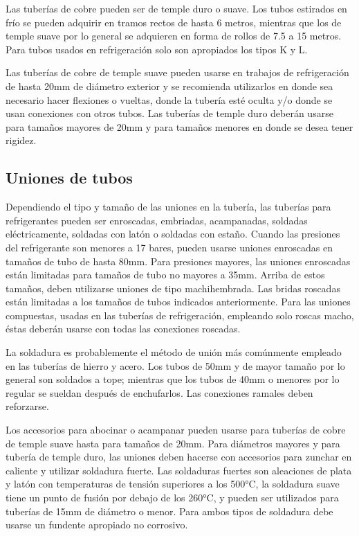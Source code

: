 	Las tuberías de cobre pueden ser de temple duro o suave. Los tubos estirados en frío se pueden adquirir en tramos rectos de hasta 6 metros, mientras que los de temple suave por lo general se adquieren en forma de rollos de 7.5 a 15 metros. Para tubos usados en refrigeración solo son apropiados los tipos K y L. 

	Las tuberías de cobre de temple suave pueden usarse en trabajos de refrigeración de hasta 20mm de diámetro exterior y se recomienda utilizarlos en donde sea necesario hacer flexiones o vueltas, donde la tubería esté oculta y/o donde se usan conexiones con otros tubos. Las tuberías de temple duro deberán usarse para tamaños mayores de 20mm y para tamaños menores en donde se desea tener rigidez.

	\subsection{Uniones de tubos}

	Dependiendo el tipo y tamaño de las uniones en la tubería, las tuberías para refrigerantes pueden ser enroscadas, embriadas, acampanadas, soldadas eléctricamente, soldadas con latón o soldadas con estaño. Cuando las presiones del refrigerante son menores a 17 bares, pueden usarse uniones enroscadas en tamaños de tubo de hasta 80mm. Para presiones mayores, las uniones enroscadas están limitadas para tamaños de tubo no mayores a 35mm. Arriba de estos tamaños, deben utilizarse uniones de tipo machihembrada. Las bridas roscadas están limitadas a los tamaños de tubos indicados anteriormente. Para las uniones compuestas, usadas en las tuberías de refrigeración, empleando solo roscas macho, éstas deberán usarse con todas las conexiones roscadas.

	La soldadura es probablemente el método de unión más comúnmente empleado en las tuberías de hierro y acero. Los tubos de 50mm y de mayor tamaño por lo general son soldados a tope; mientras que los tubos de 40mm o menores por lo regular se sueldan después de enchufarlos. Las conexiones ramales deben reforzarse.

	Los accesorios para abocinar o acampanar pueden usarse para tuberías de cobre de temple suave hasta para tamaños de 20mm. Para diámetros mayores y para tubería de temple duro, las uniones deben hacerse con accesorios para zunchar en caliente y utilizar soldadura fuerte. Las soldaduras fuertes son aleaciones de plata y latón con temperaturas de tensión superiores a los 500°C, la soldadura suave tiene un punto de fusión por debajo de los 260°C, y pueden ser utilizados para tuberías de 15mm de diámetro o menor. Para ambos tipos de soldadura debe usarse un fundente apropiado no corrosivo.

